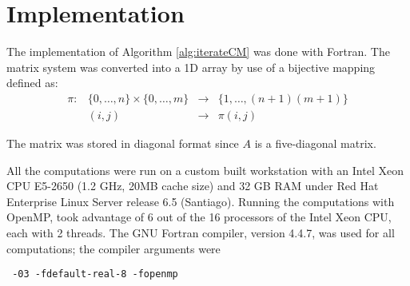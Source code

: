 \section{Implementation}

The implementation of Algorithm \ref{alg:iterateCM} was done with Fortran. The matrix system was converted into a 1D array by use of a bijective mapping defined as:
\begin{equation}
\begin{array}{clcl}
  \pi :& \{ 0, \ldots, n\} \times \{0, \ldots, m\} &\to& \{1, \ldots, (n+1)(m+1) \}\\
       & (i,j)                                     &\to& \pi(i,j)
\end{array}
\end{equation}


The matrix was stored in diagonal format since $A$ is a five-diagonal matrix.

All the computations were run on a custom built workstation with an Intel Xeon CPU E5-2650 (1.2 GHz, 20MB cache size) and 32 GB RAM under Red Hat Enterprise Linux Server release 6.5 (Santiago). 
Running the computations with OpenMP, took advantage of 6 out of the 16 processors of the Intel Xeon CPU, each with 2 threads.
The GNU Fortran compiler, version 4.4.7, was used for all computations; the compiler arguments were
\begin{verbatim} -03 -fdefault-real-8 -fopenmp \end{verbatim}

